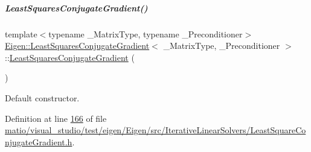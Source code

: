 \mbox{\label{group___iterative_linear_solvers___module_ace69f423fcc1f8960d0e2de0667447c9}} 
\subparagraph{\texorpdfstring{Least\+Squares\+Conjugate\+Gradient()}{LeastSquaresConjugateGradient()}\hspace{0.1cm}{\footnotesize\ttfamily [3/4]}}
{\footnotesize\ttfamily template$<$typename \+\_\+\+Matrix\+Type, typename \+\_\+\+Preconditioner$>$ \\
\hyperlink{group___iterative_linear_solvers___module_class_eigen_1_1_least_squares_conjugate_gradient}{Eigen\+::\+Least\+Squares\+Conjugate\+Gradient}$<$ \+\_\+\+Matrix\+Type, \+\_\+\+Preconditioner $>$\+::\hyperlink{group___iterative_linear_solvers___module_class_eigen_1_1_least_squares_conjugate_gradient}{Least\+Squares\+Conjugate\+Gradient} (\begin{DoxyParamCaption}{ }\end{DoxyParamCaption})\hspace{0.3cm}{\ttfamily [inline]}}

Default constructor. 

Definition at line \hyperlink{matio_2visual__studio_2test_2eigen_2_eigen_2src_2_iterative_linear_solvers_2_least_square_conjugate_gradient_8h_source_l00166}{166} of file \hyperlink{matio_2visual__studio_2test_2eigen_2_eigen_2src_2_iterative_linear_solvers_2_least_square_conjugate_gradient_8h_source}{matio/visual\+\_\+studio/test/eigen/\+Eigen/src/\+Iterative\+Linear\+Solvers/\+Least\+Square\+Conjugate\+Gradient.\+h}.

